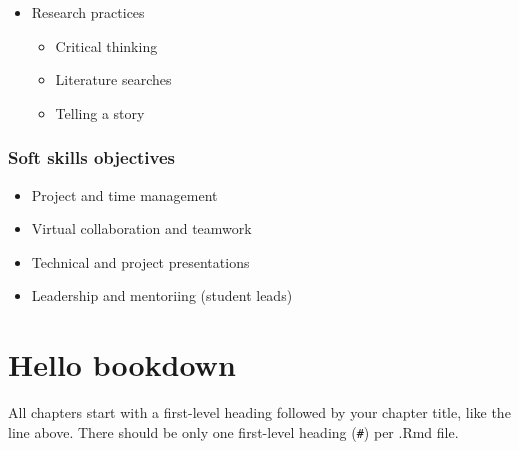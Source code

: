 \documentclass[
]{book}
\providecommand{\tightlist}{%
  \setlength{\itemsep}{0pt}\setlength{\parskip}{0pt}}
\theoremstyle{definition}
\theoremstyle{definition}
\theoremstyle{definition}
\theoremstyle{definition}
\theoremstyle{remark}
\begin{document}
\begin{itemize}
  \begin{itemize}
  \tightlist
  \item
    R syntax, pacakges, documentation, and troubleshooting
  \item
    \href{https://david.ncifcrf.gov/}{Database for Annotation, Visualization, and Integrated Discover} (DAVID)
  \item
    \href{https://maayanlab.cloud/Enrichr/}{Enrichr}
  \item
    \href{https://metascape.org/gp/index.html\#/main/step1}{Metascape: a gene anotation and analysis resource}
  \item
    \href{https://string-db.org/}{STRING: functional protein association networks}
  \item
    \href{http://gepia.cancer-pku.cn/}{Gene Expression Profiling Interactive Analysis} (GEPIA)
  \end{itemize}
\item
  Research practices

  \begin{itemize}
  \tightlist
  \item
    Critical thinking
  \item
    Literature searches
  \item
    Telling a story
  \end{itemize}
\end{itemize}

\hypertarget{soft-skills-objectives}{%
\subsection{Soft skills objectives}\label{soft-skills-objectives}}

\begin{itemize}
\tightlist
\item
  Project and time management
\item
  Virtual collaboration and teamwork
\item
  Technical and project presentations
\item
  Leadership and mentoriing (student leads)
\end{itemize}

\hypertarget{hello-bookdown}{%
\chapter{Hello bookdown}\label{hello-bookdown}}

All chapters start with a first-level heading followed by your chapter title, like the line above. There should be only one first-level heading (\texttt{\#}) per .Rmd file.
\end{document}
